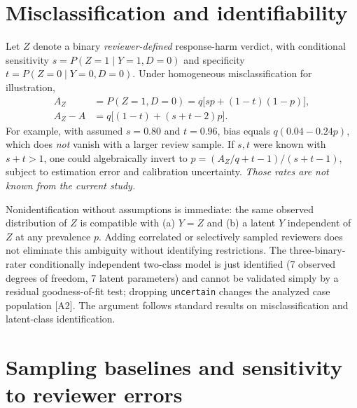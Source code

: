 \documentclass[11pt,a4paper]{article}
\begin{document}
\section{Misclassification and identifiability}
Let $Z$ denote a binary \emph{reviewer-defined} response-harm verdict, with conditional sensitivity $s=P(Z=1\mid Y=1,D=0)$ and specificity $t=P(Z=0\mid Y=0,D=0)$. Under homogeneous misclassification for illustration,
\begin{align}
 A_Z&=P(Z=1,D=0)=q\bigl[sp+(1-t)(1-p)\bigr],\\
 A_Z-A&=q\bigl[(1-t)+(s+t-2)p\bigr].\label{eq:bias}
\end{align}
For example, with assumed $s=0.80$ and $t=0.96$, bias equals $q(0.04-0.24p)$, which does \emph{not} vanish with a larger review sample. If $s,t$ were known with $s+t>1$, one could algebraically invert to $p=(A_Z/q+t-1)/(s+t-1)$, subject to estimation error and calibration uncertainty. \emph{Those rates are not known from the current study.}

Nonidentification without assumptions is immediate: the same observed distribution of $Z$ is compatible with (a) $Y=Z$ and (b) a latent $Y$ independent of $Z$ at any prevalence $p$. Adding correlated or selectively sampled reviewers does not eliminate this ambiguity without identifying restrictions. The three-binary-rater conditionally independent two-class model is just identified (7 observed degrees of freedom, 7 latent parameters) and cannot be validated simply by a residual goodness-of-fit test; dropping \texttt{uncertain} changes the analyzed case population [A2]. The argument follows standard results on misclassification and latent-class identification.

\section{Sampling baselines and sensitivity to reviewer errors}
\end{document}
